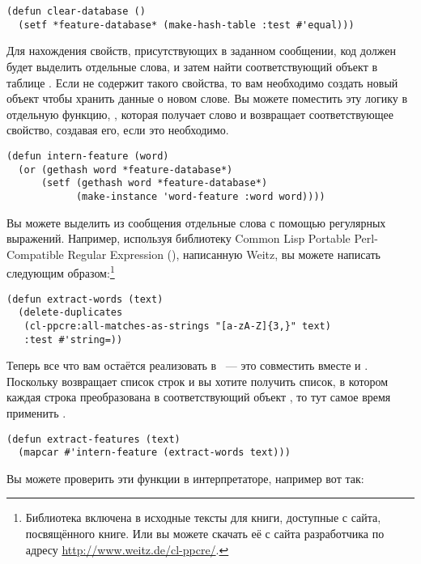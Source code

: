 \begin{lstlisting}
(defun clear-database ()
  (setf *feature-database* (make-hash-table :test #'equal)))
\end{lstlisting}

Для нахождения свойств, присутствующих в заданном сообщении, код должен будет выделить
отдельные слова, и затем найти соответствующий объект  в таблице
.  Если  не содержит такого свойства, то вам
необходимо создать новый объект  чтобы хранить данные о новом слове.  Вы
можете поместить эту логику в отдельную функцию, , которая получает
слово и возвращает соответствующее свойство, создавая его, если это необходимо.

\begin{lstlisting}
(defun intern-feature (word)
  (or (gethash word *feature-database*)
      (setf (gethash word *feature-database*)
            (make-instance 'word-feature :word word))))
\end{lstlisting}

Вы можете выделить из сообщения отдельные слова с помощью регулярных выражений.  Например,
используя библиотеку Common Lisp Portable Perl-Compatible Regular Expression
(), написанную Weitz, вы можете написать  следующим
образом:\footnote{Библиотека  включена в исходные тексты для книги,
  доступные с сайта, посвящённого книге.  Или вы можете скачать её с сайта разработчика по
  адресу \url{http://www.weitz.de/cl-ppcre/}.}

\begin{lstlisting}
(defun extract-words (text)
  (delete-duplicates
   (cl-ppcre:all-matches-as-strings "[a-zA-Z]{3,}" text)
   :test #'string=))
\end{lstlisting}

Теперь все что вам остаётся реализовать в ~--- это совместить
вместе  и .  Поскольку 
возвращает список строк и вы хотите получить список, в котором каждая строка преобразована
в соответствующий объект , то тут самое время применить .

\begin{lstlisting}
(defun extract-features (text)
  (mapcar #'intern-feature (extract-words text)))
\end{lstlisting}

Вы можете проверить эти функции в интерпретаторе, например вот так:

